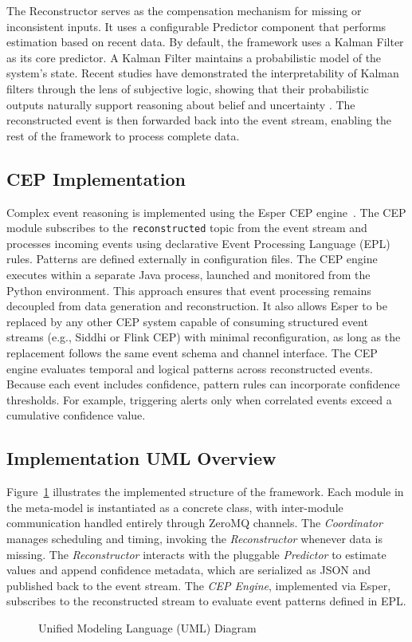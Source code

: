 The Reconstructor serves as the compensation mechanism for missing or inconsistent inputs. It uses a configurable Predictor component that performs estimation based on recent data. By default, the framework uses a Kalman Filter as its core predictor. A Kalman Filter maintains a probabilistic model of the system’s state. Recent studies have demonstrated the interpretability of Kalman filters through the lens of subjective logic, showing that their probabilistic outputs naturally support reasoning about belief and uncertainty \cite{griebel2020kalman, kang2021some}. The reconstructed event is then forwarded back into the event stream, enabling the rest of the framework to process complete data.


\subsection{CEP Implementation}
Complex event reasoning is implemented using the Esper CEP engine~\cite{esper_reference}.
The CEP module subscribes to the \texttt{reconstructed} topic from the event stream and processes incoming events using declarative Event Processing Language (EPL) rules.
Patterns are defined externally in configuration files.
The CEP engine executes within a separate Java process, launched and monitored from the Python environment.
This approach ensures that event processing remains decoupled from data generation and reconstruction.
It also allows Esper to be replaced by any other CEP system capable of consuming structured event streams (e.g., Siddhi or Flink CEP) with minimal reconfiguration, as long as the replacement follows the same event schema and channel interface.
The CEP engine evaluates temporal and logical patterns across reconstructed events. Because each event includes confidence, pattern rules can incorporate confidence thresholds. For example, triggering alerts only when correlated events exceed a cumulative confidence value.


\subsection{Implementation UML Overview}\label{subsec:arc-framework-uml}

\label{sec:implementation-uml}

Figure~\ref{fig:implementation_uml} illustrates the implemented structure of the framework.
Each module in the meta-model is instantiated as a concrete class, with inter-module communication handled entirely through ZeroMQ channels.
The \textit{Coordinator} manages scheduling and timing, invoking the \textit{Reconstructor} whenever data is missing.
The \textit{Reconstructor} interacts with the pluggable \textit{Predictor} to estimate values and append confidence metadata, which are serialized as JSON and published back to the event stream.
The \textit{CEP Engine}, implemented via Esper, subscribes to the reconstructed stream to evaluate event patterns defined in EPL.

\begin{figure}[H]
\centering
{}
\caption{Unified Modeling Language (UML) Diagram}
\label{fig:implementation_uml}
\end{figure}
